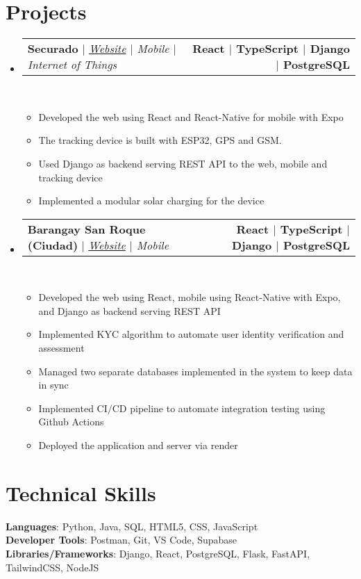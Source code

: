 \documentclass[letterpaper,11pt]{article}
\makeatletter
\newcommand{\resumeItem}[1]{
  \item\small{
    {#1 \vspace{0pt}}
  }
}
\newcommand{\resumeProjectHeading}[2]{
    \item
    \begin{tabular*}{1.001\textwidth}{l@{\extracolsep{\fill}}r}
      \small#1 & \textbf{\small #2}\\
    \end{tabular*}\vspace{-7pt}
}
\newcommand{\resumeSubHeadingListStart}{\begin{itemize}[leftmargin=0.0in, label={}]}
\newcommand{\resumeSubHeadingListEnd}{\end{itemize}}\vspace{0pt}
\newcommand{\resumeItemListStart}{\begin{itemize}}
\newcommand{\resumeItemListEnd}{\end{itemize}\vspace{-5pt}}
\makeatother
\begin{document}
\section{Projects} 
    \vspace{-5pt}
    \resumeSubHeadingListStart
    \resumeProjectHeading
            {\textbf{{Securado}} $|$ \emph{\href{https://mcgillscheduler.vercel.app/}{Website} {$|$} {Mobile} {$|$} {Internet of Things}}}{React $|$ TypeScript $|$ Django $|$ PostgreSQL}
            \\[5mm]
          \resumeItemListStart
            \resumeItem{Developed the web using React and React-Native for mobile with Expo}
            \resumeItem{The tracking device is built with ESP32, GPS and GSM.}
            \resumeItem{Used Django as backend serving REST API to the web, mobile and tracking device}
            \resumeItem{Implemented a modular solar charging for the device}
          \resumeItemListEnd
    \vspace{-20pt}
    \resumeProjectHeading
            {\textbf{{Barangay San Roque (Ciudad)}} $|$ \emph{\href{hthttps://www.sanroqueciudad.com/}{Website} {$|$} {Mobile}}}{React $|$ TypeScript $|$ Django $|$ PostgreSQL}
            \\[5mm]
          \resumeItemListStart
            \resumeItem{Developed the web using React, mobile using React-Native with Expo, and Django as backend serving REST API}
            \resumeItem{Implemented KYC algorithm to automate user identity verification and assessment}
            \resumeItem{Managed two separate databases implemented in the system to keep data in sync} 
            \resumeItem{Implemented CI{$/$}CD pipeline to automate integration testing using Github Actions}
            \resumeItem{Deployed the application and server via render} 
          \resumeItemListEnd
\resumeSubHeadingListEnd
\vspace{-12pt}

\section{Technical Skills}
 \begin{itemize}[leftmargin=0.15in, label={}]
    \small{\item{   
     \textbf{Languages}{: Python, Java, SQL, HTML5, CSS, JavaScript} \\[1mm]
     \textbf{Developer Tools}{: Postman, Git, VS Code, Supabase} \\[1mm]
     \textbf{Libraries/Frameworks}{: Django, React, PostgreSQL, Flask, FastAPI, TailwindCSS, NodeJS} \\ [1mm]
    }}
 \end{itemize}
 \vspace{-16pt}
 \vspace{3pt}
\vspace{10pt}

\vspace{-15pt}
\end{document}

